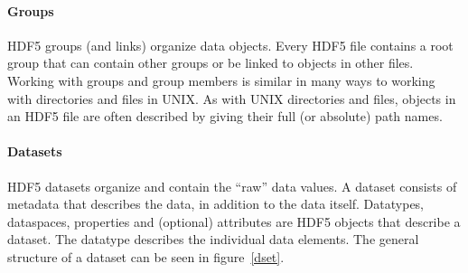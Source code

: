 \paragraph{Groups}
HDF5 groups (and links) organize data objects. Every HDF5 file contains a root group that can contain other groups or be linked to objects in other files. Working with groups and group members is similar in many ways to working with directories and files in UNIX. As with UNIX directories and files, objects in an HDF5 file are often described by giving their full (or absolute) path names.

\paragraph{Datasets}
HDF5 datasets organize and contain the “raw” data values. A dataset consists of metadata that describes the data, in addition to the data itself. Datatypes, dataspaces, properties and (optional) attributes are HDF5 objects that describe a dataset. The datatype describes the individual data elements. The general structure of a dataset can be seen in figure~\ref{dset}.












